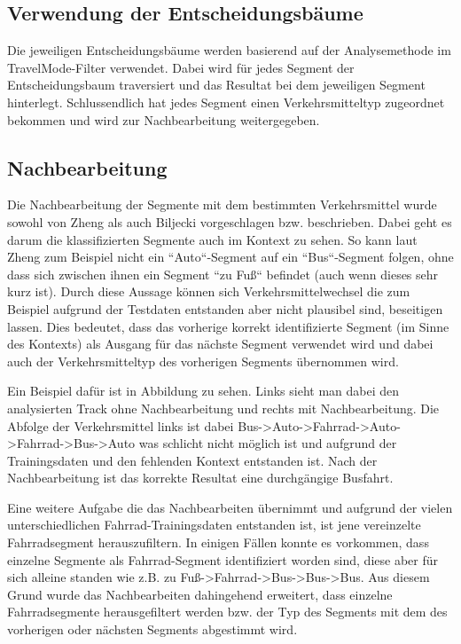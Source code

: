 \subsection{Verwendung der Entscheidungsbäume}
\label{entscheidungsbaum_verwendung}
Die jeweiligen Entscheidungsbäume werden basierend auf der Analysemethode im TravelMode-Filter verwendet. Dabei wird für jedes Segment der Entscheidungsbaum traversiert und das Resultat bei dem jeweiligen Segment hinterlegt. Schlussendlich hat jedes Segment einen Verkehrsmitteltyp zugeordnet bekommen und wird zur Nachbearbeitung weitergegeben.

\subsection{Nachbearbeitung}
\label{nachbearbeitung}
Die Nachbearbeitung der Segmente mit dem bestimmten Verkehrsmittel wurde sowohl von Zheng \cite{zheng_understanding_2010} als auch Biljecki \cite{biljecki_transportation_2013} vorgeschlagen bzw. beschrieben. Dabei geht es darum die klassifizierten Segmente auch im Kontext zu sehen. So kann laut Zheng \cite{zheng_understanding_2010} zum Beispiel nicht ein ``Auto``-Segment auf ein ``Bus``-Segment folgen, ohne dass sich zwischen ihnen ein Segment ``zu Fuß`` befindet (auch wenn dieses sehr kurz ist). Durch diese Aussage können sich Verkehrsmittelwechsel die zum Beispiel aufgrund der Testdaten entstanden aber nicht plausibel sind, beseitigen lassen. Dies bedeutet, dass das vorherige korrekt identifizierte Segment (im Sinne des Kontexts) als Ausgang für das nächste Segment verwendet wird und dabei auch der Verkehrsmitteltyp des vorherigen Segments übernommen wird. 

Ein Beispiel dafür ist in Abbildung  zu sehen. Links sieht man dabei den analysierten Track ohne Nachbearbeitung und rechts mit Nachbearbeitung. Die Abfolge der Verkehrsmittel links ist dabei Bus->Auto->Fahrrad->Auto->Fahrrad->Bus->Auto was schlicht nicht möglich ist und aufgrund der Trainingsdaten und den fehlenden Kontext entstanden ist. Nach der Nachbearbeitung ist das korrekte Resultat eine durchgängige Busfahrt. 


Eine weitere Aufgabe die das Nachbearbeiten übernimmt und aufgrund der vielen unterschiedlichen Fahrrad-Trainingsdaten entstanden ist, ist jene vereinzelte Fahrradsegment herauszufiltern. In einigen Fällen konnte es vorkommen, dass einzelne Segmente als Fahrrad-Segment identifiziert worden sind, diese aber für sich alleine standen wie z.B. zu Fuß->Fahrrad->Bus->Bus->Bus. Aus diesem Grund wurde das Nachbearbeiten dahingehend erweitert, dass einzelne Fahrradsegmente herausgefiltert werden bzw. der Typ des Segments mit dem des vorherigen oder nächsten Segments abgestimmt wird.
\clearpage

